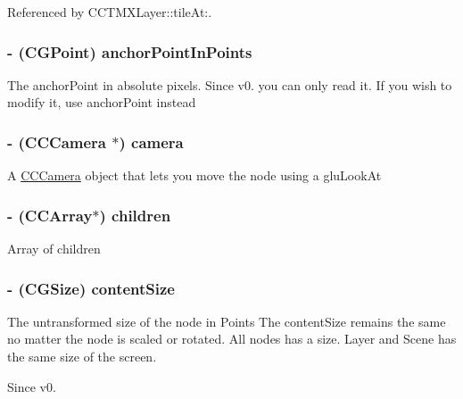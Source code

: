 Referenced by C\-C\-T\-M\-X\-Layer\-::tile\-At\-:.

\hypertarget{class_c_c_node_a8fd2bad5639f673a56eaf8b9c0302c48}{
\subsubsection[{anchor\-Point\-In\-Points}]{\setlength{\rightskip}{0pt plus 5cm}-\/ (C\-G\-Point) {\bf anchor\-Point\-In\-Points}}}\label{class_c_c_node_a8fd2bad5639f673a56eaf8b9c0302c48}
The anchor\-Point in absolute pixels. Since v0. you can only read it. If you wish to modify it, use anchor\-Point instead \hypertarget{class_c_c_node_a14b2b20d96921f92ef12b661f6aeff72}{
\subsubsection[{camera}]{\setlength{\rightskip}{0pt plus 5cm}-\/ ({\bf C\-C\-Camera} $\ast$) {\bf camera}}}\label{class_c_c_node_a14b2b20d96921f92ef12b661f6aeff72}
A \hyperlink{interface_c_c_camera}{C\-C\-Camera} object that lets you move the node using a glu\-Look\-At \hypertarget{class_c_c_node_a5e739ecda0c314283a89ac389dfca2fa}{
\subsubsection[{children}]{\setlength{\rightskip}{0pt plus 5cm}-\/ ({\bf C\-C\-Array}$\ast$) {\bf children}}}\label{class_c_c_node_a5e739ecda0c314283a89ac389dfca2fa}
Array of children \hypertarget{class_c_c_node_a7b80fa1c9ea5db76137ed9e73646ba25}{
\subsubsection[{content\-Size}]{\setlength{\rightskip}{0pt plus 5cm}-\/ (C\-G\-Size) {\bf content\-Size}}}\label{class_c_c_node_a7b80fa1c9ea5db76137ed9e73646ba25}
The untransformed size of the node in Points The content\-Size remains the same no matter the node is scaled or rotated. All nodes has a size. Layer and Scene has the same size of the screen. \begin{DoxySince}{Since}
v0. 
\end{DoxySince}


